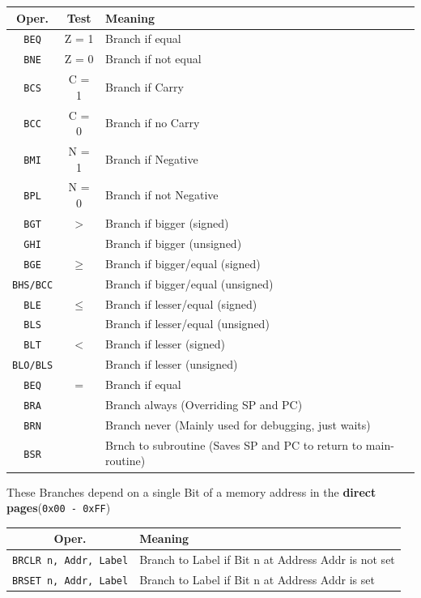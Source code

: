 \documentclass[a4paper, 11pt, nofootinbib]{article}
\renewcommand*{\thead}[1]{\bfseries #1}
\newcommand{\code}[1]{\texttt{#1}}
\begin{document}
\begin{tabular}{|c|c|l|}
	\hline
	\thead{Oper.}& \thead{Test} & \thead{Meaning}\\
	\hline
	\code{BEQ} & Z = 1 & Branch if equal\\
	\code{BNE} & Z = 0& Branch if not equal\\
	\hline
	\code{BCS} & C = 1& Branch if Carry\\
	\code{BCC} & C = 0& Branch if no Carry\\
	\hline
	\code{BMI} & N = 1& Branch if Negative\\
	\code{BPL} & N = 0& Branch if not Negative\\
	\hline
	\code{BGT} &$>$ & Branch if bigger (signed)\\
	\code{GHI} & &  Branch if bigger (unsigned)\\
	\hline
	\code{BGE} &$\geq$& Branch if bigger/equal (signed)\\
	\code{BHS/BCC} & & Branch if bigger/equal (unsigned)\\
	\hline
	\code{BLE} &$\leq$& Branch if lesser/equal (signed)\\
	\code{BLS} & & Branch if lesser/equal (unsigned)\\
	\hline
	\code{BLT} &$<$& Branch if lesser (signed)\\
	\code{BLO/BLS} & & Branch if lesser (unsigned)\\
	\hline
	\code{BEQ} &$=$& Branch if equal\\
	\hline
	\code{BRA} & & Branch always (Overriding SP and PC) \\
	\code{BRN} & & Branch never (Mainly used for debugging, just waits) \\
	\code{BSR} & & Brnch to subroutine (Saves SP and PC to return to main-routine) \\
	\hline
\end{tabular}
\vspace{10px}

\noindent These Branches depend on a single Bit of a memory address in the \textbf{direct pages}(\code{0x00 - 0xFF})
\begin{tabular}{|c|l|}
	\hline
	\thead{Oper.} & \thead{Meaning} \\
	\hline
	\code{BRCLR n, Addr, Label} & Branch to Label if Bit n at Address Addr is not set \\
	\hline
	\code{BRSET n, Addr, Label} & Branch to Label if Bit n at Address Addr is set \\
	\hline
\end{tabular}
\end{document}
